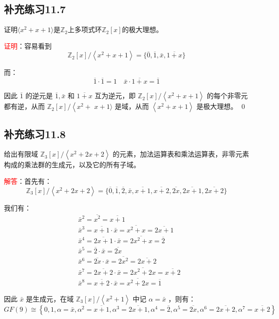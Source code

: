 \documentclass[UTF8, heading=true]{ctexart}
\begin{document}
\subsection{补充练习11.7}

证明$\langle x^2+x+1\rangle$是$\mathbb{Z}_2$上多项式环$\mathbb{Z}_2[x]$的极大理想。

\textcolor{red}{证明}：容易看到
$$
\mathbb{Z}_2[x] /\left\langle x^2+x+1\right\rangle=\{\overline{0}, \overline{1}, \bar{x}, \overline{1+x}\}
$$


而：
$$
\overline{1} \cdot \overline{1}=1 \quad \bar{x} \cdot \overline{1+x}=\overline{1}
$$


因此 $\overline{1}$ 的逆元是 $\overline{1}, \bar{x}$ 和 $\overline{1+x}$ 互为逆元，即 $\mathbb{Z}_2[x] /\left\langle x^2+x+1\right\rangle$ 的每个非零元都有逆，从而 $\mathbb{Z}_2[x] /\left\langle x^2+\right.$ $x+1\rangle$ 是域，从而 $\left\langle x^2+x+1\right\rangle$ 是极大理想。 \qed

\subsection{补充练习11.8}

给出有限域 $\mathbb{Z}_3[x] /\left\langle x^2+2 x+2\right\rangle$ 的元素，加法运算表和乘法运算表，非零元素构成的乘法群的生成元，以及它的所有子域。

\textcolor{red}{解答}：首先有：
$$
\mathbb{Z}_3[x] /\left\langle x^2+2 x+2\right\rangle=\{\overline{0}, \overline{1}, \overline{2}, \bar{x}, \overline{x+1}, \overline{x+2}, \overline{2 x}, \overline{2 x+1}, \overline{2 x+2}\}
$$


我们有：
$$
\begin{aligned}
& \bar{x}^2=\overline{x^2}=\overline{x+1} \\
& \bar{x}^3=\overline{x+1} \cdot \bar{x}=\overline{x^2+x}=\overline{2 x+1} \\
& \bar{x}^4=\overline{2 x+1} \cdot \bar{x}=\overline{2 x^2+x}=\overline{2} \\
& \bar{x}^5=\overline{2} \cdot \bar{x}=\overline{2 x} \\
& \bar{x}^6=\overline{2 x} \cdot \bar{x}=\overline{2 x^2}=\overline{2 x+2} \\
& \bar{x}^7=\overline{2 x+2} \cdot \bar{x}=\overline{2 x^2+2 x}=\overline{x+2} \\
& \bar{x}^8=\overline{x+2} \cdot \bar{x}=\overline{x^2+2 x}=\overline{1}
\end{aligned}
$$


因此 $\bar{x}$ 是生成元，在域 $\mathbb{Z}_3[x] /\left\langle x^2+1\right\rangle$ 中记 $\alpha=\bar{x}$ ，则有：
$$
G F(9) \cong\left\{0,1, \alpha=\bar{x}, \alpha^2=\overline{x+1}, \alpha^3=\overline{2 x+1}, \alpha^4=\overline{2}, \alpha^5=\overline{2 x}, \alpha^6=\overline{2 x+2}, \alpha^7=\overline{x+2}\right\}
$$
\end{document}

